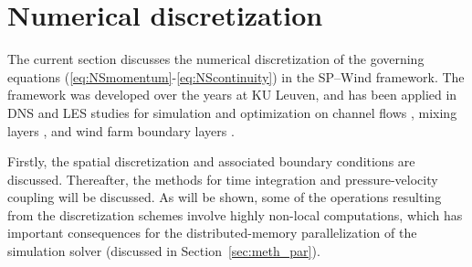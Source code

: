 \section{Numerical discretization}\label{sec:meth_discr}
The current section discusses the numerical discretization of the governing equations (\ref{eq:NSmomentum}-\ref{eq:NScontinuity}) in the SP--Wind framework. The framework was developed over the years at KU Leuven, and has been applied in DNS and LES studies for simulation and optimization on channel flows \citep{meyers2007evaluation, meyers2007plane,nita2016efficiency}, mixing layers \citep{delport2009constrained, delport2011maximizing}, and wind farm boundary layers \citep{meyers2010large, calaf2010large, allaerts2015large, goit2015optimal, goit2016optimal}.

Firstly, the spatial discretization and associated boundary conditions are discussed. Thereafter, the methods for time integration and pressure-velocity coupling will be discussed. As will be shown, some of the operations resulting from the discretization schemes involve highly non-local computations, which has important consequences for the distributed-memory parallelization of the simulation solver (discussed in Section~\ref{sec:meth_par}). 

